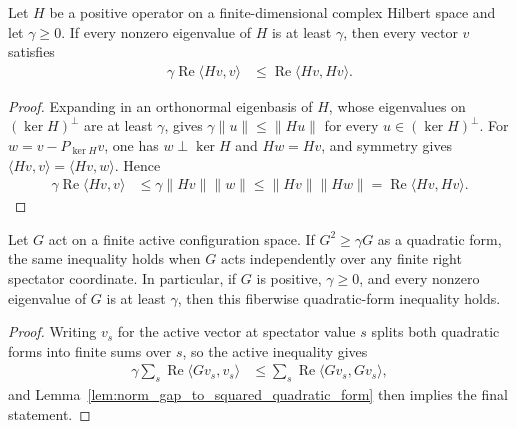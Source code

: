 \begin{lemma}
    \label{lem:norm_gap_to_squared_quadratic_form}
    \leanok
    Let $H$ be a positive operator on a finite-dimensional complex Hilbert
    space and let $\gamma\geq0$. If every nonzero eigenvalue of $H$ is at
    least $\gamma$, then every vector $v$ satisfies
    \begin{align}
        \gamma\operatorname{Re}\langle Hv,v\rangle
         & \leq \operatorname{Re}\langle Hv,Hv\rangle.
    \end{align}
\end{lemma}

\begin{proof}
    \leanok
    Expanding in an orthonormal eigenbasis of $H$, whose eigenvalues on
    $(\ker H)^\perp$ are at least $\gamma$, gives
    $\gamma\lVert u\rVert\leq\lVert Hu\rVert$ for every $u\in(\ker H)^\perp$.
    For $w=v-P_{\ker H}v$, one has $w\perp\ker H$ and $Hw=Hv$, and symmetry gives
    $\langle Hv,v\rangle=\langle Hv,w\rangle$. Hence
    \begin{align}
        \gamma\operatorname{Re}\langle Hv,v\rangle
         & \leq \gamma\lVert Hv\rVert\lVert w\rVert
        \leq \lVert Hv\rVert\lVert Hw\rVert
        =\operatorname{Re}\langle Hv,Hv\rangle.
    \end{align}
\end{proof}

\begin{lemma}
    \label{lem:right_spectator_quadratic_form_gap}
    \leanok
    Let $G$ act on a finite active configuration space. If
    $G^2\geq\gamma G$ as a quadratic form, the same inequality holds when $G$
    acts independently over any finite right spectator coordinate. In
    particular, if $G$ is positive, $\gamma\geq0$, and every nonzero
    eigenvalue of $G$ is at least $\gamma$, then this fiberwise
    quadratic-form inequality holds.
\end{lemma}

\begin{proof}
    \leanok
    Writing $v_s$ for the active vector at spectator value $s$ splits both quadratic
    forms into finite sums over $s$, so the active inequality gives
    \begin{align}
        \gamma\sum_s\operatorname{Re}\langle Gv_s,v_s\rangle
         & \leq \sum_s\operatorname{Re}\langle Gv_s,Gv_s\rangle,
    \end{align}
    and Lemma~\ref{lem:norm_gap_to_squared_quadratic_form} then implies the
    final statement.
\end{proof}

